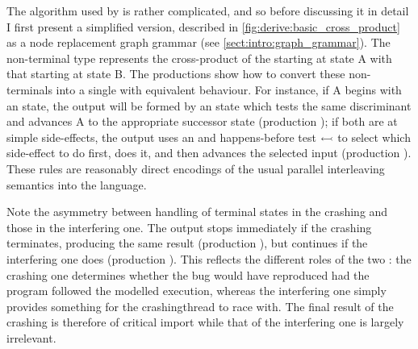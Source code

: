 The algorithm used by {\technique} is rather complicated, and so
before discussing it in detail I first present a simplified version,
described in \autoref{fig:derive:basic_cross_product} as a node
replacement graph grammar (see \autoref{sect:intro:graph_grammar}).
The non-terminal type  represents the cross-product of
the {\StateMachine} starting at state A with that starting at state B.
The productions show how to convert these non-terminals into a single
{\StateMachine} with equivalent behaviour.  For instance, if
{\StateMachine} A begins with an  state, the output
{\StateMachine} will be formed by an  state which tests the
same discriminant and advances A to the appropriate successor state
(production ); if both {\StateMachines} are at simple
side-effects, the output {\StateMachine} uses an  and
happens-before test $\leftarrowtail$ to select which side-effect
to do first, does it, and then advances the selected input
{\StateMachine} (production ).  These rules are
reasonably direct encodings of the usual parallel interleaving
semantics into the {\StateMachine} language.

Note the asymmetry between handling of terminal states in the crashing
{\StateMachine} and those in the interfering one.  The output
{\StateMachine} stops immediately if the crashing {\StateMachine}
terminates, producing the same result (production ), but
continues if the interfering {\StateMachine} one does (production
).  This reflects the different roles of the two
           {\StateMachines}: the crashing one determines whether the
           bug would have reproduced had the program followed the
           modelled execution, whereas the interfering one simply
           provides something for the \gls{crashingthread} to race
           with.  The final result of the crashing {\StateMachine} is
           therefore of critical import while that of the interfering
           one is largely irrelevant.

